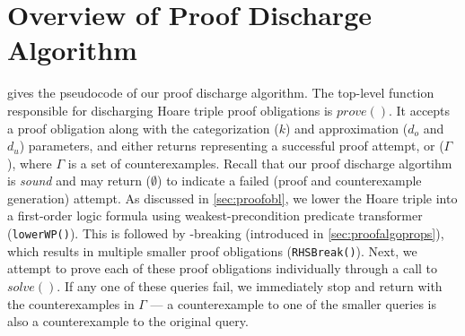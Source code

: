 \section{Overview of Proof Discharge Algorithm}
\label{sec:proofsummary}
 gives the pseudocode of our proof discharge algorithm.
The top-level function responsible for discharging Hoare triple proof obligations is $prove()$.
It accepts a proof obligation along with the categorization ($k$) and approximation ($d_o$ and $d_u$) parameters,
and either returns  representing a successful proof attempt, or ($\Gamma$),
where $\Gamma$ is a set of counterexamples.
Recall that our proof discharge algortihm is {\em sound} and may return ($\emptyset$)
to indicate a failed (proof and counterexample generation) attempt.
As discussed in \cref{sec:proofobl}, we lower the Hoare triple into a first-order logic
formula using weakest-precondition predicate transformer ({\tt lowerWP()}).
This is followed by \rhs{}-breaking (introduced in \cref{sec:proofalgoprops}),
which results in multiple smaller proof obligations ({\tt RHSBreak()}).
Next, we attempt to prove each of these proof obligations individually through a call to $solve()$.
If any one of these queries fail, we immediately stop and return  with the
counterexamples in $\Gamma$ --- a counterexample to one of the smaller queries is also a counterexample
to the original query.

